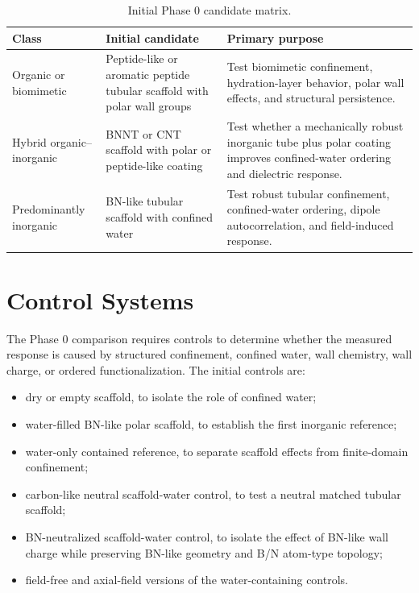 \documentclass[11pt,letterpaper]{article}
\begin{document}
\begin{table}[h!]
\centering
\small
\caption{Initial Phase 0 candidate matrix.}
\begin{tabular}{|L{0.23\textwidth}|L{0.32\textwidth}|L{0.34\textwidth}|}
\hline
\textbf{Class} & \textbf{Initial candidate} & \textbf{Primary purpose} \\
\hline
Organic or biomimetic &
Peptide-like or aromatic peptide tubular scaffold with polar wall groups &
Test biomimetic confinement, hydration-layer behavior, polar wall effects, and structural persistence. \\
\hline
Hybrid organic--inorganic &
BNNT or CNT scaffold with polar or peptide-like coating &
Test whether a mechanically robust inorganic tube plus polar coating improves confined-water ordering and dielectric response. \\
\hline
Predominantly inorganic &
BN-like tubular scaffold with confined water &
Test robust tubular confinement, confined-water ordering, dipole autocorrelation, and field-induced response. \\
\hline
\end{tabular}
\end{table}

\section{Control Systems}

The Phase 0 comparison requires controls to determine whether the measured response is caused by structured confinement, confined water, wall chemistry, wall charge, or ordered functionalization. The initial controls are:

\begin{itemize}
    \item dry or empty scaffold, to isolate the role of confined water;
    \item water-filled BN-like polar scaffold, to establish the first inorganic reference;
    \item water-only contained reference, to separate scaffold effects from finite-domain confinement;
    \item carbon-like neutral scaffold-water control, to test a neutral matched tubular scaffold;
    \item BN-neutralized scaffold-water control, to isolate the effect of BN-like wall charge while preserving BN-like geometry and B/N atom-type topology;
    \item field-free and axial-field versions of the water-containing controls.
\end{itemize}
\end{document}
